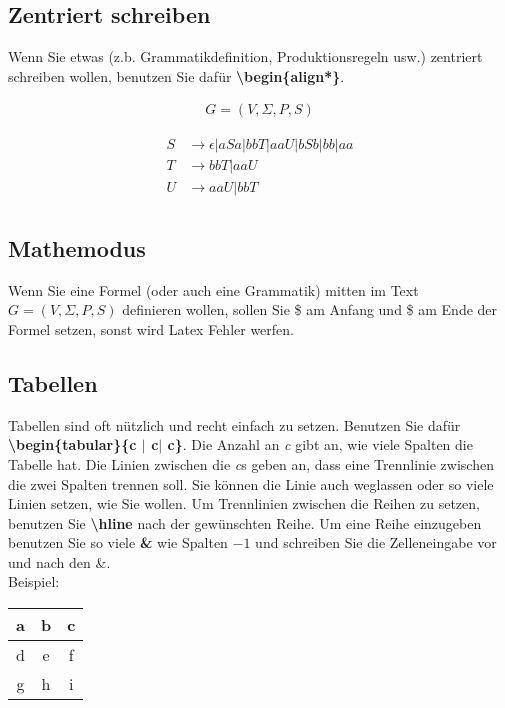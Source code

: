 \documentclass[a4paper]{scrartcl}
\begin{document}
\subsection*{Zentriert schreiben}
Wenn Sie etwas (z.b. Grammatikdefinition, Produktionsregeln usw.) zentriert schreiben wollen, benutzen Sie dafür \textbf{\textbackslash begin\{align*\}}. 

  \begin{align*}
  G = (V, \Sigma, P, S)
  \end{align*}
  
    \begin{align*}
    S &\rightarrow \epsilon | aSa | bbT | aaU | bSb | bb | aa\\
    T &\rightarrow bbT | aaU\\
    U &\rightarrow aaU | bbT \\
    \end{align*}
  
\subsection*{Mathemodus}
Wenn Sie eine Formel (oder auch eine Grammatik) mitten im Text $G = (V, \Sigma, P, S)$ definieren wollen, sollen Sie \$ am Anfang und \$ am Ende der Formel setzen, sonst wird Latex Fehler werfen.

\subsection*{Tabellen}

Tabellen sind oft nützlich und recht einfach zu setzen. Benutzen Sie dafür \\ \textbf{\textbackslash begin\{tabular\}\{c $\mid$ c$\mid$ c\}}. Die Anzahl an \textit{c} gibt an, wie viele Spalten die Tabelle hat. Die Linien zwischen die \textit{c}s geben an, dass eine Trennlinie zwischen die zwei Spalten trennen soll. Sie können die Linie auch weglassen oder so viele Linien setzen, wie Sie wollen. Um Trennlinien zwischen die Reihen zu setzen, benutzen Sie \textbf{\textbackslash hline} nach der gewünschten Reihe. Um eine Reihe einzugeben benutzen Sie so viele \textbf{\&} wie Spalten $- 1$ und schreiben Sie die Zelleneingabe vor und nach den \&. \\ Beispiel:

\begin{center}
\begin{tabular}{|c||cc|}
\hline
 a & b & c\\
 \hline
 d & e & f\\
 g & h & i\\
 \hline
\end{tabular} 
\end{center}
\end{document}
